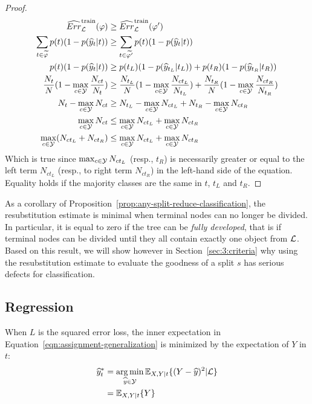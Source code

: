 \begin{proof}
\begin{align*}
\widehat{Err}_{\cal L}^\text{train}(\varphi) &\geq \widehat{Err}_{\cal L}^\text{train}(\varphi^\prime)  \\
\sum_{t \in \widetilde{\varphi}} p(t) (1 - p(\widehat{y}_t | t)) &\geq \sum_{t \in \widetilde{\varphi^\prime}} p(t) (1 - p(\widehat{y}_t | t)) \\
p(t) (1 - p(\widehat{y}_t | t)) &\geq p(t_L) (1 - p(\widehat{y}_{t_L} | t_L)) + p(t_R) (1 - p(\widehat{y}_{t_R} | t_R))\\
\frac{N_t}{N} (1 - \max_{c \in {\cal Y}} \frac{N_{ct}}{N_t}) &\geq \frac{N_{t_L}}{N} (1 - \max_{c \in {\cal Y}} \frac{N_{ct_L}}{N_{t_L}}) + \frac{N_{t_R}}{N} (1 - \max_{c \in {\cal Y}} \frac{N_{ct_R}}{N_{t_R}}) \\
N_t - \max_{c \in {\cal Y}} N_{ct} &\geq N_{t_L} - \max_{c \in {\cal Y}} N_{ct_L} + N_{t_R} - \max_{c \in {\cal Y}} N_{ct_R} \\
\max_{c \in {\cal Y}} N_{ct} &\leq \max_{c \in {\cal Y}} N_{ct_L} + \max_{c \in {\cal Y}} N_{ct_R} \\
\max_{c \in {\cal Y}} (N_{ct_L} + N_{ct_R}) &\leq \max_{c \in {\cal Y}} N_{ct_L} + \max_{c \in {\cal Y}} N_{ct_R}
\end{align*}
Which is true since $\max_{c \in {\cal Y}} N_{ct_L}$ (resp., $t_R$) is
necessarily greater or equal to the left term $N_{ct_L}$ (resp., to right term
$N_{ct_R}$) in the left-hand side of the equation. Equality holds if the
majority classes are the same in $t$, $t_L$ and $t_R$.
\end{proof}

As a corollary of Proposition~\ref{prop:any-split-reduce-classification}, the
resubstitution estimate is minimal when terminal nodes can no longer be
divided.  In particular, it is equal to zero if the tree can be \textit{fully
developed}, that is if terminal nodes can be divided until they all contain
exactly one object from ${\cal L}$. Based on this result, we will show however
in Section~\ref{sec:3:criteria} why using the resubstitution estimate to
evaluate the goodness of a split $s$ has serious defects for classification.

\subsection{Regression}

When $L$ is the squared error loss, the inner expectation in
Equation~\ref{eqn:assignment-generalization}
is minimized by the expectation of $Y$ in $t$:
\begin{align}
\widehat{y}_t^* &= \operatorname*{arg\,min}_{\widehat{y} \in {\cal Y}} \mathbb{E}_{X, Y|t}\{ (Y - \widehat{y})^2 | {\cal L} \} \nonumber \\
                &= \mathbb{E}_{X, Y|t} \{ Y \} \label{eqn:assignment-regression}
\end{align}

